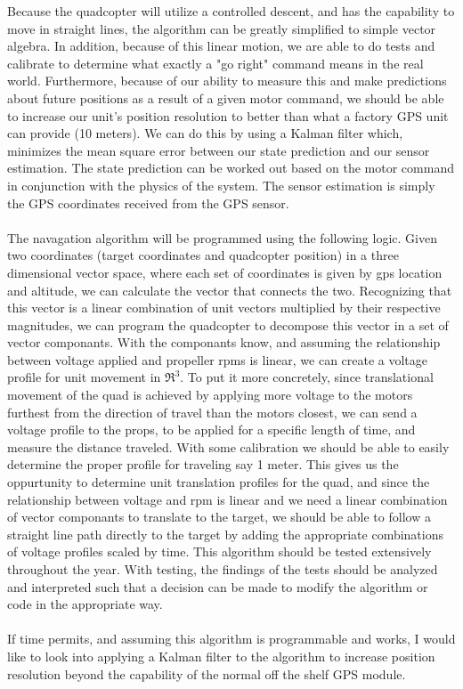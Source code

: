 \documentclass[10pt,a4paper]{article}
\begin{document}
Because the quadcopter will utilize a controlled descent, and has the capability to move in straight lines, the algorithm can be greatly simplified to simple vector algebra. In addition, because of this linear motion, we are able to do tests and calibrate to determine what exactly a "go right" command means in the real world. Furthermore, because of our ability to measure this and make predictions about future positions as a result of a given motor command, we should be able to increase our unit's position resolution to better than what a factory GPS unit can provide (10 meters). We can do this by using a Kalman filter which, minimizes the mean square error between our state prediction and our sensor estimation. The state prediction can be worked out based on the motor command in conjunction with the physics of the system. The sensor estimation is simply the GPS coordinates received from the GPS sensor.\paragraph{}
The navagation algorithm will be programmed using the following logic. Given two coordinates (target coordinates and quadcopter position) in a three dimensional vector space, where each set of coordinates is given by gps location and altitude, we can calculate the vector that connects the two. Recognizing that this vector is a linear combination of unit vectors multiplied by their respective magnitudes, we can program the quadcopter to decompose this vector in a set of vector componants. With the componants know, and assuming the relationship between voltage applied and propeller rpms is linear, we can create a voltage profile for unit movement in $\Re^3$. To put it more concretely, since translational movement of the quad is achieved by applying more voltage to the motors furthest from the direction of travel than the motors closest, we can send a voltage profile to the props, to be applied for a specific length of time, and measure the distance traveled. With some calibration we should be able to easily determine the proper profile for traveling say 1 meter. This gives us the oppurtunity to determine unit translation profiles for the quad, and since the relationship between voltage and rpm is linear and we need a linear combination of vector componants to translate to the target, we should be able to follow a straight line path directly to the target by adding the appropriate combinations of voltage profiles scaled by time. This algorithm should be tested extensively throughout the year. With testing, the findings of the tests should be analyzed and interpreted such that a decision can be made to modify the algorithm or code in the appropriate way. \paragraph{}If time permits, and assuming this algorithm is programmable and works, I would like to look into applying a Kalman filter to the algorithm to increase position resolution beyond the capability of the normal off the shelf GPS module.
\end{document}
